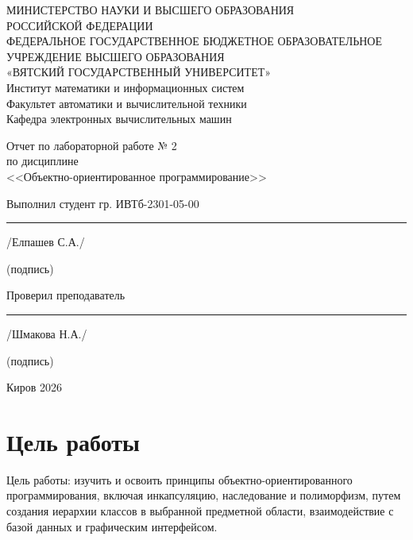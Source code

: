\documentclass[oneside,14pt,a4paper]{extarticle}
\begin{document}
  \newpage\thispagestyle{empty}
  
  \begin{center}
      МИНИСТЕРСТВО НАУКИ И ВЫСШЕГО ОБРАЗОВАНИЯ\\
    РОССИЙСКОЙ ФЕДЕРАЦИИ\\
    ФЕДЕРАЛЬНОЕ ГОСУДАРСТВЕННОЕ БЮДЖЕТНОЕ ОБРАЗОВАТЕЛЬНОЕ
    УЧРЕЖДЕНИЕ ВЫСШЕГО ОБРАЗОВАНИЯ\\
    «ВЯТСКИЙ ГОСУДАРСТВЕННЫЙ УНИВЕРСИТЕТ»\\
    Институт математики и информационных систем\\
    Факультет автоматики и вычислительной техники\\
    Кафедра электронных вычислительных машин\\
  \end{center}

  \vfill

  \begin{center}
    Отчет по лабораторной работе № 2\\
    по дисциплине\\
    <<Объектно-ориентированное программирование>>
  \end{center}

  \vfill

  Выполнил студент гр. ИВТб-2301-05-00 \hfill \rule[-0.5mm]{3cm}{0.15mm} /Елпашев С.А./\\[-5ex]

  \begin{tiny}
    \hspace{11cm}(подпись)
  \end{tiny}
  
  Проверил преподаватель \hfill \rule[-0.5mm]{3cm}{0.15mm} /Шмакова Н.А./\\[-5ex]
  
  \begin{tiny}
    \hspace{11cm}(подпись)
  \end{tiny}
  
  \vfill
  
  \begin{center}
    Киров 2026
  \end{center}

  \newpage\thispagestyle{plain}  

  \section{Цель работы}
  Цель работы: изучить и освоить принципы объектно-ориентированного программирования, включая инкапсуляцию, наследование и полиморфизм, путем создания иерархии классов в выбранной предметной области, взаимодействие с базой данных и графическим интерфейсом.
\end{document}
